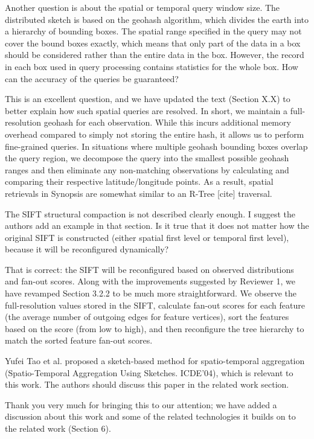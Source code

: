 \documentclass{article}
\begin{document}
Another question is about the spatial or temporal query window size. The
distributed sketch is based on the geohash algorithm, which divides the
earth into a hierarchy of bounding boxes. The spatial range specified in
the query may not cover the bound boxes exactly, which means that only
part of the data in a box should be considered rather than the entire
data in the box. However, the record in each box used in query
processing contains statistics for the whole box. How can the accuracy
of the queries be guaranteed?

\begin{tcolorbox}
This is an excellent question, and we have updated the text (Section
X.X) to better explain how such spatial queries are resolved. In short,
we maintain a full-resolution geohash for each observation. While this
incurs additional memory overhead compared to simply not storing the
entire hash, it allows us to perform fine-grained queries. In situations
where multiple geohash bounding boxes overlap the query region, we
decompose the query into the smallest possible geohash ranges and then
eliminate any non-matching observations by calculating and comparing
their respective latitude/longitude points. As a result, spatial
retrievals in Synopsis are somewhat similar to an R-Tree {[}cite{]}
traversal.
\end{tcolorbox}

The SIFT structural compaction is not described clearly enough. I
suggest the authors add an example in that section. Is it true that it
does not matter how the original SIFT is constructed (either spatial
first level or temporal first level), because it will be reconfigured
dynamically?

\begin{tcolorbox}
That is correct: the SIFT will be reconfigured based on observed
distributions and fan-out scores. Along with the improvements suggested
by Reviewer 1, we have revamped Section 3.2.2 to be much more
straightforward. We observe the full-resolution values stored in the
SIFT, calculate fan-out scores for each feature (the average number of
outgoing edges for feature vertices), sort the features based on the
score (from low to high), and then reconfigure the tree hierarchy to
match the sorted feature fan-out scores.
\end{tcolorbox}

Yufei Tao et al. proposed a sketch-based method for spatio-temporal
aggregation (Spatio-Temporal Aggregation Using Sketches. ICDE'04), which
is relevant to this work. The authors should discuss this paper in the
related work section.

\begin{tcolorbox}
Thank you very much for bringing this to our attention; we have added a
discussion about this work and some of the related technologies it
builds on to the related work (Section 6).
\end{tcolorbox}
\end{document}
